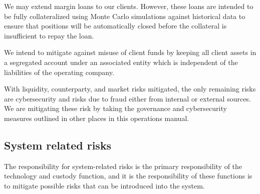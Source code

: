 We may extend margin loans to our clients. However,
these loans are intended to be fully collateralized using Monte Carlo
simulations against historical data to ensure that positions will be
automatically closed before the collateral is insufficient to repay
the loan.

We intend to mitigate against misuse of client funds by keeping all
client assets in a segregated account under an associated entity which
is independent of the liabilities of the operating company.

With liquidity, counterparty, and market risks mitigated, the only
remaining risks are cybersecurity and risks due to fraud either from
internal or external sources.  We are mitigating these risk by taking
the governance and cybersecurity measures outlined in other places in
this operations manual.

\subsection{System related risks}
The responsibility for system-related risks is the primary
responsibility of the technology and custody function, and it is
the responsibility of these functions is to mitigate possible risks that can
be introduced into the system.
